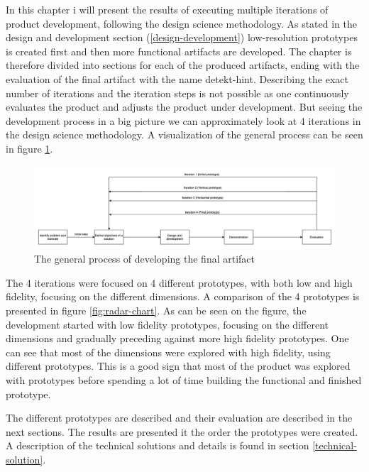 \documentclass{report}
\begin{document}
In this chapter i will present the results of executing multiple iterations of product development, following the design science methodology. As stated in the design and development section (\ref{design-development}) low-resolution 
prototypes is created first and then more functional artifacts are developed. The chapter is therefore divided into sections for each of the produced artifacts, ending with the evaluation of the final artifact with the name detekt-hint. Describing the exact number of iterations and the iteration steps is not possible as one continuously evaluates the product and adjusts the product under development. But seeing the development process in a big picture we can approximately look at 4 iterations in the design science methodology. A visualization of the general process can be seen in figure \ref{fig:workflow}.


\begin{figure}[h!]
    \centering
    \includegraphics[width=\linewidth]{../images/workflow.png}
    \caption{The general process of developing the final artifact}
    \label{fig:workflow}
\end{figure}

The 4 iterations were focused on 4 different prototypes, with both low and high fidelity, focusing on the different dimensions. A comparison of the 4 prototypes is presented in figure \ref{fig:radar-chart}. As can be seen on the figure, the development started with low fidelity prototypes, focusing on the different dimensions and gradually preceding against more high fidelity prototypes. One can see that most of the dimensions were explored with high fidelity, using different prototypes. This is a good sign that most of the product was explored with prototypes before spending a lot of time building the functional and finished prototype. 

The different prototypes are described and their evaluation are described in the next sections. The results are presented it the order the prototypes were created. A description of the technical solutions and details is found in section \ref{technical-solution}.
\end{document}
